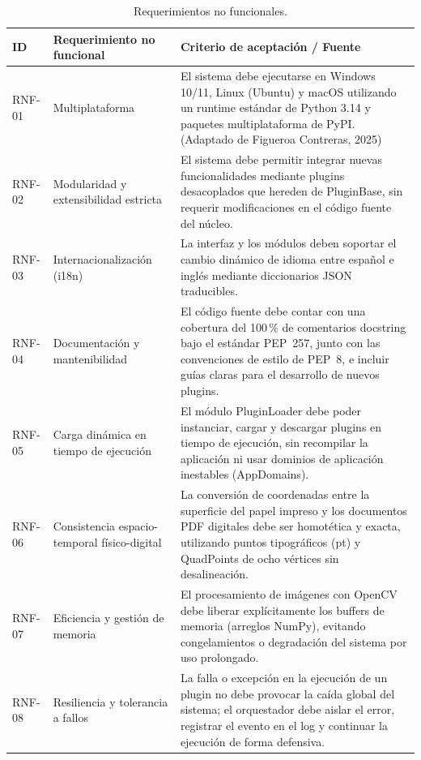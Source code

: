 \begin{table}[H]
    \centering
    \caption{Requerimientos no funcionales.}
    \label{tab:rnf}
    \begin{small}
    \begin{tabular}{|L{1.2cm}|L{3.0cm}|L{9.5cm}|}
        \hline
        \textbf{ID} & \textbf{Requerimiento no funcional} & \textbf{Criterio de aceptación / Fuente} \\ \hline
        RNF-01 & Multiplataforma & El sistema debe ejecutarse en Windows 10/11, Linux (Ubuntu) y macOS utilizando un runtime estándar de Python 3.14 y paquetes multiplataforma de PyPI. (Adaptado de Figueroa Contreras, 2025) \\ \hline
        RNF-02 & Modularidad y extensibilidad estricta & El sistema debe permitir integrar nuevas funcionalidades mediante plugins desacoplados que hereden de  PluginBase, sin requerir modificaciones en el código fuente del núcleo. \\ \hline
        RNF-03 & Internacionalización (i18n) & La interfaz y los módulos deben soportar el cambio dinámico de idioma entre español e inglés mediante diccionarios JSON traducibles. \\ \hline
        RNF-04 & Documentación y mantenibilidad & El código fuente debe contar con una cobertura del 100\,\% de comentarios docstring bajo el estándar PEP~257, junto con las convenciones de estilo de PEP~8, e incluir guías claras para el desarrollo de nuevos plugins. \\ \hline
        RNF-05 & Carga dinámica en tiempo de ejecución & El módulo PluginLoader debe poder instanciar, cargar y descargar plugins en tiempo de ejecución, sin recompilar la aplicación ni usar dominios de aplicación inestables (AppDomains). \\ \hline
        RNF-06 & Consistencia espacio-temporal físico-digital & La conversión de coordenadas entre la superficie del papel impreso y los documentos PDF digitales debe ser homotética y exacta, utilizando puntos tipográficos (pt) y QuadPoints de ocho vértices sin desalineación. \\ \hline
        RNF-07 & Eficiencia y gestión de memoria & El procesamiento de imágenes con OpenCV debe liberar explícitamente los buffers de memoria (arreglos NumPy), evitando congelamientos o degradación del sistema por uso prolongado. \\ \hline
        RNF-08 & Resiliencia y tolerancia a fallos & La falla o excepción en la ejecución de un plugin no debe provocar la caída global del sistema; el orquestador debe aislar el error, registrar el evento en el log y continuar la ejecución de forma defensiva. \\ \hline
    \end{tabular}
    \end{small}
\end{table}
 

